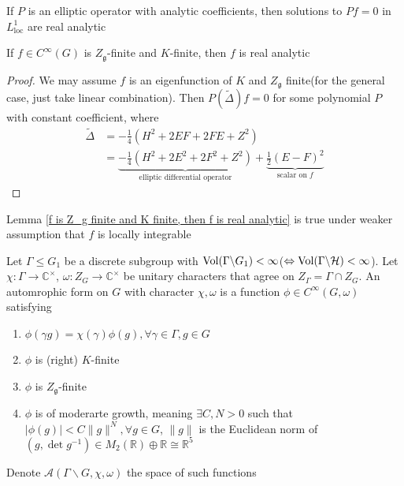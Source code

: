 \documentclass[main]{subfiles}
\begin{document}
\begin{theorem}
If $P$ is an elliptic operator with analytic coefficients, then solutions to $Pf=0$ in $L^1_{\text{loc}}$ are real analytic
\end{theorem}

\begin{lemma}\label{f is Z_g finite and K finite, then f is real analytic}
If $f\in C^\infty(G)$ is $Z_{\mathfrak g}$-finite and $K$-finite, then $f$ is real analytic
\end{lemma}

\begin{proof}
We may assume $f$ is an eigenfunction of $K$ and $Z_{\mathfrak g}$ finite(for the general case, just take linear combination). Then $P(\tilde\Delta)f=0$ for some polynomial $P$ with constant coefficient, where
\begin{align*}
\tilde\Delta&=-\frac{1}{4}(H^2+2EF+2FE+Z^2) \\
&=\underbrace{-\frac{1}{4}(H^2+2E^2+2F^2+Z^2)}_{\text{elliptic differential operator}}+\underbrace{\frac{1}{2}(E-F)^2}_{\text{scalar on $f$}}
\end{align*}
\end{proof}

\begin{remark}
Lemma \ref{f is Z_g finite and K finite, then f is real analytic} is true under weaker assumption that $f$ is locally integrable
\end{remark}

\begin{definition}
Let $\Gamma\leq G_1$ be a discrete subgroup with $\operatorname{Vol}(\Gamma\backslash G_1)<\infty$($\Leftrightarrow\operatorname{Vol}(\Gamma\backslash\mathcal H)<\infty$). Let $\chi:\Gamma\to\mathbb C^\times$, $\omega:Z_G\to\mathbb C^\times$ be unitary characters that agree on $Z_\Gamma=\Gamma\cap Z_G$. An automrophic form on $G$ with character $\chi,\omega$ is a function $\phi\in C^\infty(G,\omega)$ satisfying
\begin{enumerate}
\item $\phi(\gamma g)=\chi(\gamma)\phi(g),\forall \gamma\in\Gamma,g\in G$
\item $\phi$ is (right) $K$-finite
\item $\phi$ is $Z_{\mathfrak g}$-finite
\item $\phi$ is of moderarte growth, meaning $\exists C,N>0$ such that $|\phi(g)|<C\|g\|^N,\forall g\in G$, $\|g\|$ is the Euclidean norm of $(g,\det g^{-1})\in M_2(\mathbb R)\oplus\mathbb R\cong\mathbb R^5$
\end{enumerate}
Denote $\mathcal A(\Gamma\backslash G,\chi,\omega)$ the space of such functions
\end{definition}
\end{document}
